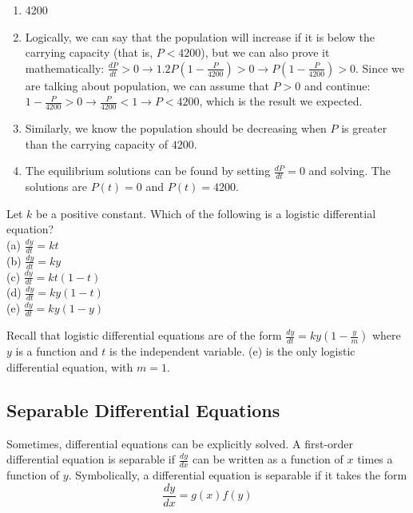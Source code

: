 \begin{Answer}[ref = logdiff1]
\begin{enumerate}
\item 4200
\item Logically, we can say that the population will increase if it is below 
the carrying capacity (that is, $P < 4200$), but we can also prove it 
mathematically: $\frac{dP}{dt} > 0 \rightarrow 1.2P \left( 1 - \frac{P}{4200} 
\right) > 0 \rightarrow P \left( 1 - \frac{P}{4200} \right) > 0$. Since we are 
talking about population, we can assume that $P > 0$ and continue: $1 - 
\frac{P}{4200} > 0 \rightarrow \frac{P}{4200} < 1 \rightarrow P < 4200$, which 
is the result we expected. 
\item Similarly, we know the population should be decreasing when $P$ is 
greater than the carrying capacity of $4200$.
\item The equilibrium solutions can be found by setting $\frac{dP}{dt} = 0$ 
and solving. The solutions are $P(t) = 0$ and $P(t) = 4200$. 
\end{enumerate}
\end{Answer}

\begin{Exercise} Let $k$ be a positive constant. 
Which of the following is a logistic differential equation?\\
(a) $\frac{dy}{dt} = kt$\\
(b) $\frac{dy}{dt} = ky$\\
(c) $\frac{dy}{dt} = kt(1 - t)$\\
(d) $\frac{dy}{dt} = ky(1 - t)$\\
(e) $\frac{dy}{dt} = ky(1 - y)$
\end{Exercise}

\begin{Answer}[ref = logdiff2]
Recall that logistic differential equations are of the form $\frac{dy}{dt} = 
ky(1 - \frac{y}{m})$ where $y$ is a function and $t$ is the independent 
variable. (e) is the only logistic differential equation, with $m = 1$. 
\end{Answer}


\subsection{Separable Differential Equations}
Sometimes, differential equations can be explicitly solved. A 
first-order differential equation is separable if $\frac{dy}{dx}$ can 
be written as a function of $x$ times a function of $y$. Symbolically, 
a differential equation is separable if it takes the form 
$$\frac{dy}{dx} = g(x)f(y)$$

